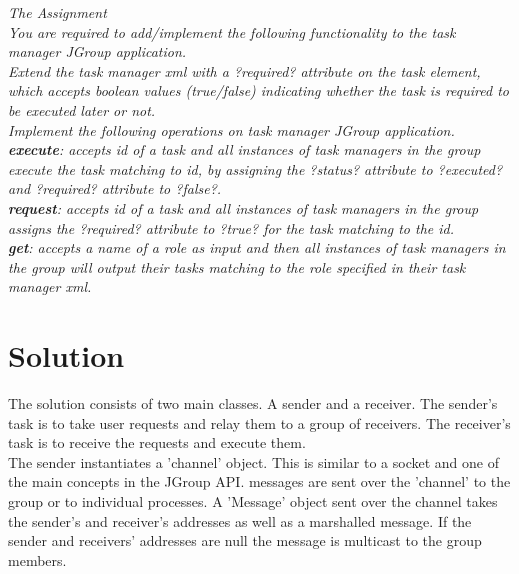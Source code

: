 \textit{The Assignment}\\

\textit{You are required to add/implement the following functionality to the task manager JGroup application.}\\

\textit{Extend the task manager xml with a ?required? attribute on the task element, which accepts boolean values (true/false) indicating whether the task is required to be executed later or not.}\\

\textit{Implement the following operations on task manager JGroup application.}\\

\textit{\textbf{execute}: accepts id of a task and all instances of task managers in the group execute the task matching to id, by assigning the ?status? attribute to ?executed? and ?required? attribute to ?false?.}\\

\textit{\textbf{request}: accepts id of a task and  all instances of task managers in the group assigns the ?required? attribute to ?true? for the task matching to the id.}\\

\textit{\textbf{get}: accepts a name of a role as input and then all instances of task managers in the group will output their tasks matching to the role specified in their task manager xml.}\\




\section{Solution}
\label{jgroup_solution}

The solution consists of two main classes. A sender and a receiver. The sender's task is to take user requests and relay them to a group of receivers.
The receiver's task is to receive the requests and execute them. \\ 

The sender instantiates a 'channel' object. This is similar to a socket and one of the main concepts in the JGroup API. messages are sent over the 'channel' to the group or to individual processes.  A 'Message' object sent over the channel takes the sender's and receiver's addresses as well as a marshalled message. If the sender and receivers' addresses are null the message is multicast to the group members.\\

